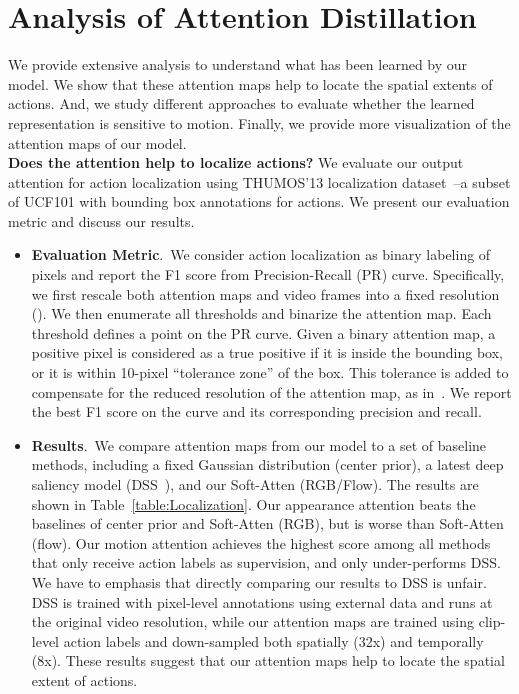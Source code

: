 \documentclass{bmvc2k}
\begin{document}
\section*{Analysis of Attention Distillation}
We provide extensive analysis to understand what has been learned by our model. We show that these attention maps help to locate the spatial extents of actions. And, we study different approaches to evaluate whether the learned representation is sensitive to motion. Finally, we provide more visualization of the attention maps of our model.\\


\noindent \textbf{Does the attention help to localize actions?} We evaluate our output attention for action localization using THUMOS'13 localization dataset~\cite{idrees2017thumos}--a subset of UCF101 with bounding box annotations for actions. We present our evaluation metric and discuss our results.
\begin{itemize}[leftmargin=*]
    \item \textbf{Evaluation Metric}.\ We consider action localization as binary labeling of pixels and report the F1 score from Precision-Recall (PR) curve. Specifically, we first rescale both attention maps and video frames into a fixed resolution (). We then enumerate all thresholds and binarize the attention map. Each threshold defines a point on the PR curve. Given a binary attention map, a positive pixel is considered as a true positive if it is inside the bounding box, or it is within 10-pixel ``tolerance zone'' of the box. This tolerance is added to compensate for the reduced resolution of the attention map, as in~\cite{oquab2015object}. We report the best F1 score on the curve and its corresponding precision and recall.

    \item \textbf{Results}.\ We compare attention maps from our model to a set of baseline methods, including a fixed Gaussian distribution (center prior), a latest deep saliency model (DSS~\cite{hou2017deeply}), and our Soft-Atten (RGB/Flow). The results are shown in Table~\ref{table:Localization}. Our appearance attention beats the baselines of center prior and Soft-Atten (RGB), but is worse than Soft-Atten (flow). Our motion attention achieves the highest score among all methods that only receive action labels as supervision, and only under-performs DSS. We have to emphasis that directly comparing our results to DSS is unfair. DSS is trained with pixel-level annotations using external data and runs at the original video resolution, while our attention maps are trained using clip-level action labels and down-sampled both spatially (32x) and temporally (8x). These results suggest that our attention maps help to locate the spatial extent of actions. 
\end{itemize}
\end{document}
